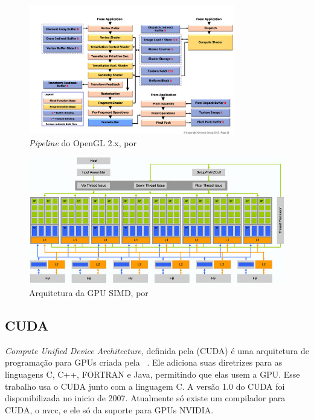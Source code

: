 \begin{figure}[H]
    \centering
    \includegraphics[width=0.8\textwidth]{figuras/pipeline.jpg}
    \caption{\textit{Pipeline} do OpenGL 2.x, por \citep{pipeline}}
    \label{fig:pipeline}
\end{figure}

\begin{figure}[H]
    \centering
    \includegraphics[width=1\textwidth]{figuras/simd.jpg}
    \caption{Arquitetura da GPU SIMD, por \citep{blythe2008rise}}
    \label{fig:simd}
\end{figure}

\subsection{CUDA}
\textit{Compute Unified Device Architecture}, definida pela (CUDA) é uma arquitetura de programação para GPUs criada 
pela ~\cite{nvidia2007compute}.
Ele adiciona suas diretrizes para as linguagens C, C++, FORTRAN e Java, permitindo que elas usem a GPU.
Esse trabalho usa o CUDA junto com a linguagem C.
A versão 1.0 do CUDA foi disponibilizada no inicio de 2007. Atualmente só existe um compilador para CUDA, o nvcc,
e ele só da suporte para GPUs NVIDIA.

